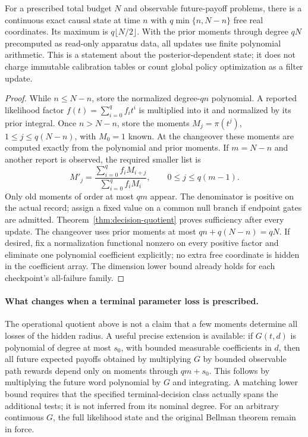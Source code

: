\begin{theorem}\label{thm:causal-horizon}
For a prescribed total budget $N$ and observable future-payoff problems,
there is a continuous exact causal state at time $n$ with
$q\min\{n,N-n\}$ free real coordinates. Its maximum is
$q\lfloor N/2\rfloor$. With the prior moments through degree $qN$
precomputed as read-only apparatus data, all updates use finite polynomial
arithmetic. This is a statement about the posterior-dependent state;
it does not charge immutable calibration tables or count global policy
optimization as a filter update.
\end{theorem}
\begin{proof}
While $n\le N-n$, store the normalized degree-$qn$ polynomial. A reported
likelihood factor $f(t)=\sum_{i=0}^q f_it^i$ is multiplied into it and
normalized by its prior integral. Once $n>N-n$, store the moments
$M_j=\pi(t^j)$, $1\le j\le q(N-n)$, with $M_0=1$ known. At the changeover
these moments are computed exactly from the polynomial and prior moments.
If $m=N-n$ and another report is observed, the required smaller list is
\begin{equation}\label{eq:shrinking-update}
 M'_j=\frac{\sum_{i=0}^q f_iM_{i+j}}
             {\sum_{i=0}^q f_iM_i},\qquad 0\le j\le q(m-1).
\end{equation}
Only old moments of order at most $qm$ appear. The denominator is positive
on the actual record; assign a fixed value on a common null branch if
endpoint gates are admitted. Theorem~\ref{thm:decision-quotient} proves
sufficiency after every update. The changeover uses prior moments at most
$qn+q(N-n)=qN$. If desired, fix a normalization functional nonzero on every
positive factor and eliminate one polynomial coefficient explicitly; no
extra free coordinate is hidden in the coefficient array. The dimension
lower bound already holds for each checkpoint's all-failure family.
\end{proof}

\paragraph{What changes when a terminal parameter loss is prescribed.}
The operational quotient above is not a claim that a few moments determine
all losses of the hidden radius. A useful precise extension is available:
if $G(t,d)$ is polynomial of degree at most $s_0$, with bounded measurable
coefficients in $d$, then all future expected payoffs obtained by multiplying
$G$ by bounded observable path rewards depend only on moments through
$qm+s_0$. This follows by multiplying the future word polynomial by $G$
and integrating. A matching lower bound requires that the specified
terminal-decision class actually spans the additional tests; it is not
inferred from its nominal degree. For an arbitrary continuous $G$, the
full likelihood state and the original Bellman theorem remain in force.


